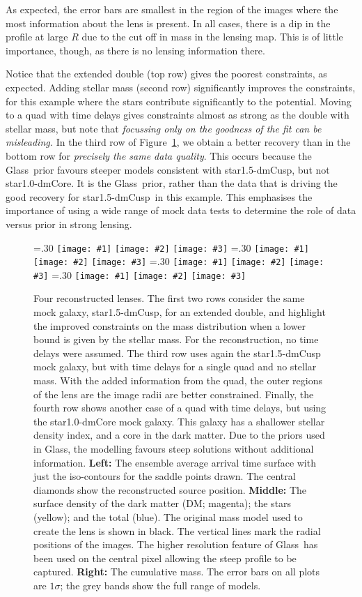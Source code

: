 \documentclass[galley,usenatbib]{mn2e}
\newcommand{\Glass}{{\sc Glass}}
\newcommand{\figref}[1] {Figure~\ref{#1}}
\newcommand{\mockAA}{{\sc star1.0-dmCore}}
\newcommand{\mockBC}{{\sc star1.5-dmCusp}}
\newcommand\plotthree[3]{{%
 \centering
 \leavevmode
 \columnwidth=.30\textwidth
 \texttt{[image: \#1]}%
 \hfil
 \texttt{[image: \#2]}%
 \hfil
 \texttt{[image: \#3]}%
}}%
\begin{document}
As expected, the error bars are smallest in the region of the images where the
most information about the lens is present. In all cases, there is a dip in the
profile at large $R$ due to the cut off in mass in the lensing map. This is of
little importance, though, as there is no lensing information there. 

Notice that the extended double (top row) gives the poorest constraints, as
expected. Adding stellar mass (second row) significantly improves the
constraints, for this example where the stars contribute significantly to the
potential. Moving to a quad with time delays gives constraints almost as strong
as the double with stellar mass, but note that {\it focussing only on the
goodness of the fit can be misleading.} In the third row of
\figref{reconstruction}, we obtain a better recovery than in the bottom row for
{\it precisely the same data quality}. This occurs because the \Glass\ prior
favours steeper models consistent with \mockBC, but not \mockAA. It is the
\Glass\ prior, rather than the data that is driving the good recovery for
\mockBC\ in this example. This emphasises the importance of using a wide range
of mock data tests to determine the role of data versus prior in strong
lensing.

\begin{figure}
  \plotthree{BCExtendedDoubleR1_tms-a.pdf} {BCExtendedDoubleR1_tms-b.pdf} {BCExtendedDoubleR1_tms-c.pdf}
  \plotthree{BCExtendedDoubleR1_tmS-a-1.pdf} {BCExtendedDoubleR1_tmS-b-1.pdf} {BCExtendedDoubleR1_tmS-c-1.pdf}
  \plotthree{BCQuadR1a_Tms-a.pdf} {BCQuadR1a_Tms-b.pdf} {BCQuadR1a_Tms-c.pdf}
  \plotthree{AAQuadR1a_Tms-a.pdf} {AAQuadR1a_Tms-b.pdf} {AAQuadR1a_Tms-c.pdf}
\caption{
    Four reconstructed lenses. The first two rows consider the same mock
    galaxy, \mockBC, for an extended double, and highlight the improved
    constraints on the mass distribution when a lower bound is given by the
    stellar mass. For the reconstruction, no time delays were assumed.  The
    third row uses again the \mockBC{} mock galaxy, but with time delays
    for a single quad and no stellar mass. With the added information from the
    quad, the outer regions of the lens are the image radii are better
    constrained. Finally, the fourth row shows another case of a quad with time
    delays, but using the \mockAA{} mock galaxy. This galaxy has a shallower
    stellar density index, and a core in the dark matter. Due to the priors
    used in \Glass, the modelling favours steep solutions without additional
    information.
\textbf{Left:}
The ensemble average arrival time surface with just the iso-contours for the
saddle points drawn. The central diamonds show the reconstructed source
position.
\textbf{Middle:}
The surface density of the dark matter (DM; magenta); the stars (yellow); and the total (blue).
The original mass model used to create the lens is shown in black.
The vertical lines mark the radial positions of the images. The higher
resolution feature of \Glass\ has been used on the central pixel allowing the
steep profile to be captured.
\textbf{Right:}
The cumulative mass. The error bars on all plots are $1\sigma$; the grey bands show the full range of models.}
\label{reconstruction}
\end{figure}
\end{document}
